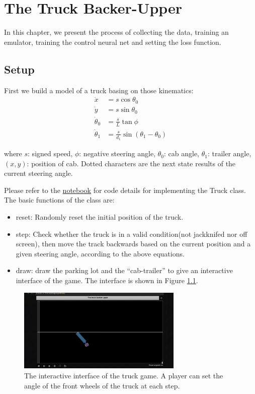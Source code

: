 \chapter{The Truck Backer-Upper}

In this chapter, we present the process of collecting the data, training an emulator, training the control neural net and setting the loss function. 
\section{Setup}

First we build a model of a truck basing on those kinematics:
\begin{align}
\dot x &= s \cos \theta_0 \\
\dot y &= s \sin \theta_0 \\
\dot \theta_0 &= \frac{s}{L} \tan \phi \\
\dot \theta_1 &= \frac{s}{d_1} \sin(\theta_1 - \theta_0)
\end{align}

where $s$: signed speed, $\phi$: negative steering angle, $\theta_0$: cab angle, $\theta_1$: trailer angle, $(x, y)$: position of cab. Dotted characters are the next state results of the current steering angle.

Please refer to the \href{https://github.com/Atcold/pytorch-Deep-Learning-Minicourse/blob/master/14-truck_backer-upper.ipynb}{notebook} for code details for implementing the Truck class. The basic functions of the class are: 
\begin{itemize}
\item reset: Randomly reset the initial position of the truck.
\item step: Check whether the truck is in a valid condition(not jackknifed nor off screen), then move the track backwards based on the current position and a given steering angle, according to the above equations.
\item draw: draw the parking lot and the ``cab-trailer'' to give an interactive interface of the game. The interface is shown in Figure \ref{fig:truck-interface}.
\end{itemize}

\begin{figure}[H]
    \centering
    \includegraphics[width=0.7\textwidth]{labs/13/images/Screen Shot 2019-05-03 at 2.03.51 PM.png}
    \caption{The interactive interface of the truck game. A player can set the angle of the front wheels
    \label{fig:truck-interface}
    of the truck at each step.}
\end{figure}

